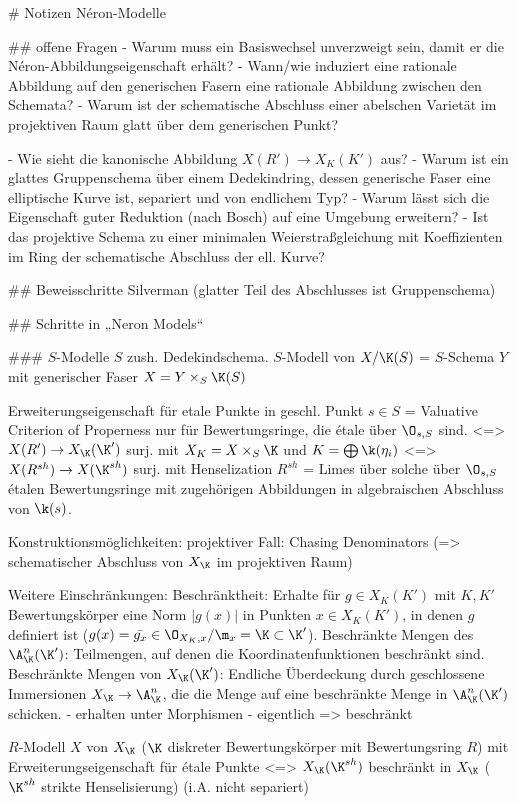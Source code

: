 # Notizen Néron-Modelle

## offene Fragen
- Warum muss ein Basiswechsel unverzweigt sein, damit er die
  Néron-Abbildungseigenschaft erhält?
- Wann/wie induziert eine rationale Abbildung auf den generischen
  Fasern eine rationale Abbildung zwischen den Schemata?
- Warum ist der schematische Abschluss einer abelschen Varietät im
  projektiven Raum glatt über dem generischen Punkt?

- Wie sieht die kanonische Abbildung $X(R')\to X_K(K')$ aus?
- Warum ist ein glattes Gruppenschema über einem Dedekindring, dessen
  generische Faser eine elliptische Kurve ist, separiert und von
  endlichem Typ?
- Warum lässt sich die Eigenschaft guter Reduktion (nach Bosch) auf
  eine Umgebung erweitern?
- Ist das projektive Schema zu einer minimalen Weierstraßgleichung mit
  Koeffizienten im Ring der schematische Abschluss der ell. Kurve?

  
## Beweisschritte Silverman (glatter Teil des Abschlusses ist Gruppenschema)



## Schritte in „Neron Models“

### $S$-Modelle 
$S$ zush. Dedekindschema.
$S$-Modell von $X/\K(S)$ = $S$-Schema $Y$ mit generischer Faser $X=Y \times_S \K(S)$

Erweiterungseigenschaft für etale Punkte in geschl. Punkt $s\in S$
= Valuative Criterion of Properness nur für Bewertungsringe, die étale
über $\O_{s,S}$ sind.
<=> $X(R') \to X_\K(\K')$ surj.
    mit $X_K=X \times_S \K$ und $K=\bigoplus \k(\eta_i)$
<=> $X(R^{sh}) \to X(\K^{sh})$ surj.
    mit Henselization $R^{sh}$ = Limes über solche über $\O_{s,S}$ étalen
    Bewertungsringe mit zugehörigen Abbildungen in algebraischen Abschluss
    von $\k(s)$.

Konstruktionsmöglichkeiten:
projektiver Fall: Chasing Denominators (=> schematischer Abschluss von
$X_\K$ im projektiven Raum)

Weitere Einschränkungen:
Beschränktheit: Erhalte für $g\in X_K(K')$ mit $K,K'$ Bewertungskörper
eine Norm $|g(x)|$ in Punkten $x\in X_K(K')$, in denen $g$ definiert
ist ($g(x)=\bar{g_x}\in \O_{X_K,x}/\m_x=\K\subset\K' $).
Beschränkte Mengen des $\A_\K^n(\K')$: Teilmengen, auf denen die
Koordinatenfunktionen beschränkt sind.
Beschränkte Mengen von $X_\K(\K')$: Endliche Überdeckung durch
geschlossene Immersionen $X_\K\to\A_\K^n$, die die Menge auf eine
beschränkte Menge in $\A_\K^n(\K')$ schicken.
- erhalten unter Morphismen
- eigentlich => beschränkt

$R$-Modell $X$ von $X_\K$ ($\K$ diskreter Bewertungskörper mit
Bewertungsring $R$) mit Erweiterungseigenschaft für étale Punkte
<=> $X_\K(\K^{sh})$ beschränkt in $X_\K$ ($\K^{sh}$ strikte
Henselisierung)
(i.A. nicht separiert)
